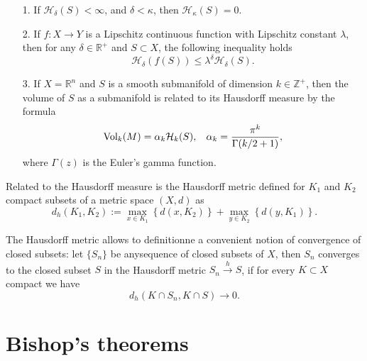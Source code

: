 \documentclass[12pt,twoside,a4paper]{report}
\newcommand{\zah}{\ensuremath{ \mathbb Z }}
\newcommand{\re}{\ensuremath{\mathbb R }}
\begin{document}
\begin{enumerate}
        \item[1.] If $\mathcal{H}_{\delta}(S)<\infty$, and $\delta<\kappa$, then $\mathcal{H}_{\kappa}(S)=0$.\\

        \item[2.] If $f:X\rightarrow Y$ is a Lipschitz continuous function with
        Lipschitz constant $\lambda$, then for any $\delta\in\re^{+}$ and
        $S\subset X$, the following inequality holds
        \[
        \mathcal{H}_{\delta}(f(S))\leq\lambda^{\delta}\mathcal{H}_{\delta}(S).
        \]
        \item[3.]If $X=\re^{n}$ and $S$ is a smooth submanifold of dimension
        $k\in\zah^{+}$, then the volume of $S$ as a submanifold is related to
        its Hausdorff measure by the formula
        \[
        \textrm{Vol}_{k}(M)=\alpha_{k}\mathcal{H}_k(S),\hspace*{0.3cm}\alpha_k= \frac{\pi^k}{\Gamma(k/2+1)},
        \]
\noindent where $\Gamma(z)$ is the Euler's gamma function.
\end{enumerate}

Related to the Hausdorff measure is the Hausdorff metric defined for $K_1$
and $K_2$ compact subsets of a metric space $(X,d)$ as $$
d_h(K_1,K_2):= \max_{x\in K_1}\left\{d(x,K_2)\right\}+\max_{y\in K_2}\left\{d(y,K_1)\right\}.$$

The Hausdorff metric allows to definitionne a convenient notion of convergence of closed subsets: let $\{S_n \}$ be anysequence of closed subsets of $X$, then $S_n$ converges to the closed subset $S$ in the Hausdorff metric $S_n\overset{h}\rightarrow S$, if for every $K\subset X$ compact we have
\[
  d_h(K\cap S_n,K\cap S)\rightarrow 0.
\]
\section{Bishop's theorems}
\end{document}
